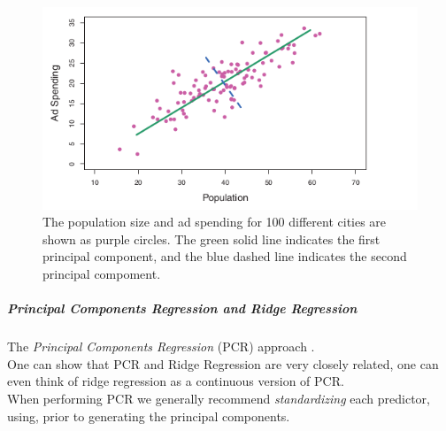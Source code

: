 \begin{figure}[H]
	\begin{center}
		\includegraphics[width=\textwidth]{./chap/1chap/5sec/images/3principalCompoment.png} \end{center}
	\caption{The population size and ad spending for 100 different
	cities are shown as purple circles. The green solid line
	indicates the first principal component, and the blue dashed
	line indicates the second principal compoment.}
	\label{fig:3principalCompoment}
\end{figure}

\subparagraph{Principal Components Regression and Ridge Regression}
The \emph{Principal Components Regression} (PCR) approach .\\

One can show that PCR and Ridge Regression are very closely related, 
one can even think of ridge regression as a continuous version of PCR.
\\
When performing PCR we generally recommend \emph{standardizing} each
predictor, using, prior to generating the principal components.\\

